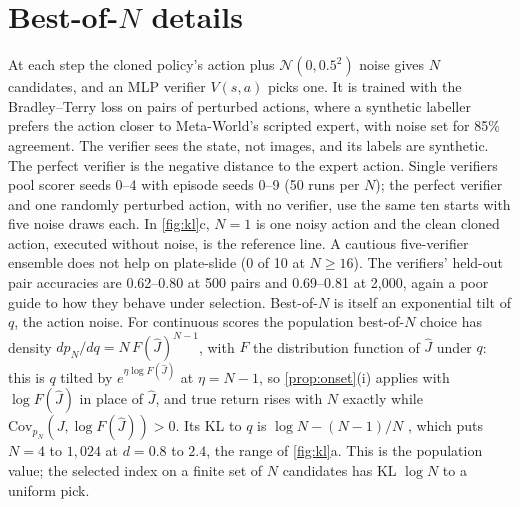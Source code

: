 \documentclass{article}
\theoremstyle{plain}
\theoremstyle{remark}
\newcommand{\Jh}{\hat{J}}
\newcommand{\Cov}{\mathrm{Cov}}
\begin{document}
\section{Best-of-$N$ details}
\label{app:bon}
At each step the cloned policy's action plus $\mathcal N(0,0.5^2)$ noise gives $N$ candidates, and an MLP verifier
$V(s,a)$ picks one. It is trained with the Bradley--Terry loss on pairs of perturbed actions, where a synthetic labeller
prefers the action closer to Meta-World's scripted expert, with noise set for 85\% agreement. The verifier sees the
state, not images, and its labels are synthetic. The perfect verifier is the negative distance to the expert action.
Single verifiers pool scorer seeds 0--4 with episode seeds 0--9 (50 runs per $N$); the perfect verifier and one
randomly perturbed action, with no verifier, use the same ten starts with five noise draws each. In \cref{fig:kl}c,
$N=1$ is one noisy action and the clean cloned action, executed without noise, is the reference line. A cautious five-verifier ensemble does not help on
plate-slide (0 of 10 at $N\ge16$). The verifiers' held-out pair accuracies are 0.62--0.80 at 500 pairs and 0.69--0.81
at 2,000, again a poor guide to how they behave under selection. Best-of-$N$ is itself an exponential tilt of $q$, the action noise. For continuous scores the
population best-of-$N$ choice has density $dp_N/dq=N\,F(\Jh)^{N-1}$, with $F$ the distribution function of $\Jh$ under
$q$: this is $q$ tilted by $e^{\eta\log F(\Jh)}$ at $\eta=N-1$, so \cref{prop:onset}(i) applies with $\log F(\Jh)$ in
place of $\Jh$, and true return rises with $N$ exactly while $\Cov_{p_N}(J,\log F(\Jh))>0$. Its KL to $q$ is
$\log N-(N-1)/N$ \citep{stiennon2020learning,beirami2024theoretical}, which puts $N=4$ to $1{,}024$ at $d=0.8$ to $2.4$,
the range of \cref{fig:kl}a. This is the population value; the selected index on a finite set of $N$ candidates has KL
$\log N$ to a uniform pick.
\end{document}
